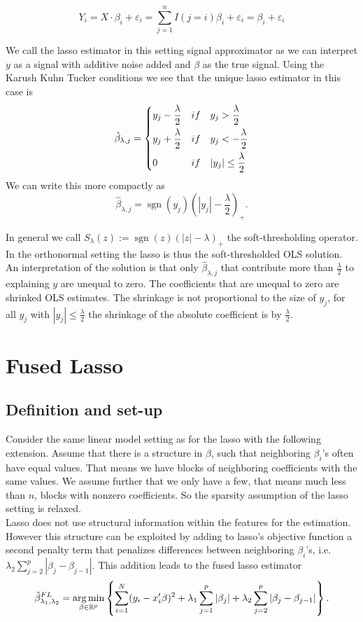 \documentclass{article}
\theoremstyle{definition}
\DeclareMathOperator*{\argmin}{arg\,min}
\DeclareMathOperator*{\sgn}{sgn}
\begin{document}
$$Y_i=X \cdot\beta_i+\varepsilon_i=\sum^n_{j=1}I(j=i)\beta_i+\varepsilon_i = \beta_i + \varepsilon_i$$

We call the lasso estimator in this setting signal approximator as we can interpret $y$ as a signal with additive noise added and $\beta$ as the true signal.
Using the Karush Kuhn Tucker conditions we see that the unique lasso estimator in this case is
$$\hat\beta_{\lambda,j}= \begin{dcases} y_j-\frac{\lambda}{2} &if \quad y_j>\frac{\lambda}{2}\\
y_j+\frac{\lambda}{2} &if \quad y_j<-\frac{\lambda}{2}\\
0						 &if \quad |y_j|\leq \frac{\lambda}{2}
\end{dcases}$$
We can write this more compactly as 
\begin{equation}
 \hat\beta_{\lambda,j} = \sgn(y_j)(|y_j|-\frac{\lambda}{2})_+.
\end{equation}

\noindent In general we call $S_\lambda(z) := \sgn(z)(|z|-\lambda)_+$ the soft-thresholding operator. In the orthonormal setting the lasso is thus the soft-thresholded OLS solution.
An interpretation of the solution is that only $\hat\beta_{\lambda,j}$ that contribute more than $\frac{\lambda}{2}$ to explaining $y$ are unequal to zero. The coefficients that are unequal to zero are shrinked OLS estimates. The shrinkage is not proportional to the size of $y_j$, for all $y_j$ with $|y_j|\leq \frac{\lambda}{2}$ the shrinkage of the absolute coefficient is by $\frac{\lambda}{2}$.

\section{Fused Lasso}

\subsection{Definition and set-up}

Consider the same linear model setting as for the lasso with the following extension. Assume that there is a structure in $\beta$, such that neighboring $\beta_i$'s often have equal values. That means we have blocks of neighboring coefficients with the same values. We assume further that we only have a few, that means much less than $n$, blocks with nonzero coefficients. So the sparsity assumption of the lasso setting is relaxed.\\
Lasso does not use structural information within the features for the estimation. However this structure can be exploited by adding to lasso's objective function a second penalty term that penalizes differences between neighboring $\beta_i$'s, i.e. $\lambda_2\sum_{j=2}^p|\beta_j- \beta_{j-1}|$. This addition leads to the fused lasso estimator 
	\begin{equation}\label{eq: fusedlasso}
		\hat{\beta}_{\lambda_1,\lambda_2}^{FL}=\argmin_{\beta \in\rm \mathbb{R}^p} \left\{   \sum_{i=1}^{N}(y_{i}-x_{i}'\beta)^2+\lambda_1 \sum_{j=1}^p|\beta_j|+ \lambda_2 \sum_{j=2}^p|\beta_j- \beta_{j-1}| \right \}.
	\end{equation}
	
\end{document}
